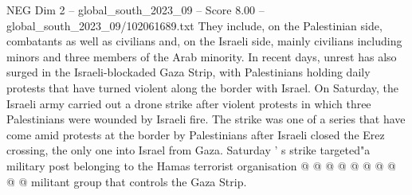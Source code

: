 \begin{textsample}{NEG Dim 2 – global\_south\_2023\_09 – Score 8.00 – global\_south\_2023\_09/102061689.txt}
They include, on the Palestinian side, combatants as well as civilians and, on the Israeli side, mainly civilians including minors and three members of the Arab minority.
In recent days, unrest has also surged in the Israeli-blockaded Gaza Strip, with Palestinians holding daily protests that have turned violent along the border with Israel.
On Saturday, the Israeli army carried out a drone strike after violent protests in which three Palestinians were wounded by Israeli fire.
The strike was one of a series that have come amid protests at the border by Palestinians after Israeli closed the Erez crossing, the only one into Israel from Gaza.
Saturday ' s strike targeted"a military post belonging to the Hamas terrorist organisation @ @ @ @ @ @ @ @ @ @ militant group that controls the Gaza Strip.

\end{textsample}
